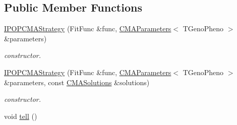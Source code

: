 \subsection*{Public Member Functions}
\begin{DoxyCompactItemize}
\item 
\hyperlink{classlibcmaes_1_1IPOPCMAStrategy_a0fad3e1160695878d2d8075a4cddf786}{I\-P\-O\-P\-C\-M\-A\-Strategy} (Fit\-Func \&func, \hyperlink{classlibcmaes_1_1CMAParameters}{C\-M\-A\-Parameters}$<$ T\-Geno\-Pheno $>$ \&parameters)
\begin{DoxyCompactList}\small\item\em constructor. \end{DoxyCompactList}\item 
\hyperlink{classlibcmaes_1_1IPOPCMAStrategy_aa904db73802865f6a83d3ad05710bc67}{I\-P\-O\-P\-C\-M\-A\-Strategy} (Fit\-Func \&func, \hyperlink{classlibcmaes_1_1CMAParameters}{C\-M\-A\-Parameters}$<$ T\-Geno\-Pheno $>$ \&parameters, const \hyperlink{classlibcmaes_1_1CMASolutions}{C\-M\-A\-Solutions} \&solutions)
\begin{DoxyCompactList}\small\item\em constructor. \end{DoxyCompactList}\item 
\hypertarget{classlibcmaes_1_1IPOPCMAStrategy_a9b3b59e7caf752f48b37500d84736137}{void \hyperlink{classlibcmaes_1_1IPOPCMAStrategy_a9b3b59e7caf752f48b37500d84736137}{tell} ()}\label{classlibcmaes_1_1IPOPCMAStrategy_a9b3b59e7caf752f48b37500d84736137}


\end{DoxyCompactItemize}
